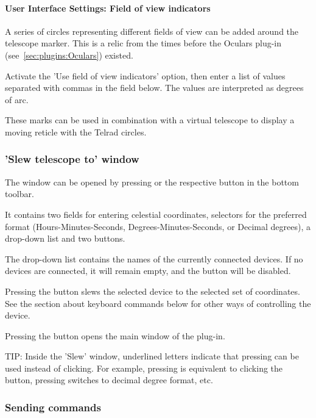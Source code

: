 \paragraph{User Interface Settings: Field of view indicators}

A series of circles representing different fields of view can be added
around the telescope marker. This is a relic from the times before the
Oculars plug-in (see~\ref{sec:plugins:Oculars}) existed.

Activate the 'Use field of view indicators' option, then enter
a list of values separated with commas in the field below. The values
are interpreted as degrees of arc.

These marks can be used in combination with a virtual telescope to
display a moving reticle with the Telrad circles.


\subsubsection{'Slew telescope to' window}

The  window can be opened by pressing  or the respective button in the bottom toolbar.

It contains two fields for entering celestial coordinates, selectors
for the preferred format (Hours-Minutes-Seconds,
Degrees-Minutes-Seconds, or Decimal degrees), a drop-down list and two
buttons.

The drop-down list contains the names of the currently connected
devices. If no devices are connected, it will remain empty, and the
 button will be disabled.

Pressing the  button slews the selected device to the selected set
of coordinates. See the section about keyboard commands below for
other ways of controlling the device.

Pressing the  button opens the main window of
the plug-in.

TIP: Inside the 'Slew' window, underlined letters indicate that
pressing  can be used instead of
clicking. For example, pressing  is equivalent to
clicking the  button, pressing  switches to
decimal degree format, etc.


\subsubsection{Sending commands}

